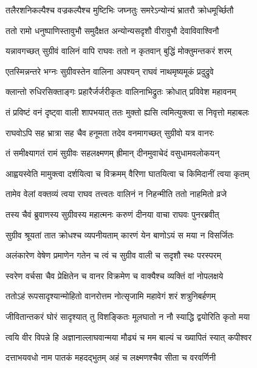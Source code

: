 \twolineshloka
{तलैरशनिकल्पैश्च वज्रकल्पैश्च मुष्टिभिः}
{जघ्नतुः समरेऽन्योन्यं भ्रातरौ क्रोधमूर्च्छितौ} %

\twolineshloka
{ततो रामो धनुष्पाणिस्तावुभौ समुदैक्षत}
{अन्योन्यसदृशौ वीरावुभौ देवाविवाश्विनौ} %

\twolineshloka
{यन्नावगच्छत् सुग्रीवं वालिनं वापि राघवः}
{ततो न कृतवान् बुद्धिं मोक्तुमन्तकरं शरम्} %

\twolineshloka
{एतस्मिन्नन्तरे भग्नः सुग्रीवस्तेन वालिना}
{अपश्यन् राघवं नाथमृष्यमूकं प्रदुद्रुवे} %

\twolineshloka
{क्लान्तो रुधिरसिक्ताङ्गः प्रहारैर्जर्जरीकृतः}
{वालिनाभिद्रुतः क्रोधात् प्रविवेश महावनम्} %

\twolineshloka
{तं प्रविष्टं वनं दृष्ट्वा वाली शापभयात् ततः}
{मुक्तो ह्यसि त्वमित्युक्त्वा स निवृत्तो महाबलः} %

\twolineshloka
{राघवोऽपि सह भ्रात्रा सह चैव हनूमता}
{तदेव वनमागच्छत् सुग्रीवो यत्र वानरः} %

\twolineshloka
{तं समीक्ष्यागतं रामं सुग्रीवः सहलक्ष्मणम्}
{ह्रीमान् दीनमुवाचेदं वसुधामवलोकयन्} %

\twolineshloka
{आह्वयस्वेति मामुक्त्वा दर्शयित्वा च विक्रमम्}
{वैरिणा घातयित्वा च किमिदानीं त्वया कृतम्} %

\twolineshloka
{तामेव वेलां वक्तव्यं त्वया राघव तत्त्वतः}
{वालिनं न निहन्मीति ततो नाहमितो व्रजे} %

\twolineshloka
{तस्य चैवं ब्रुवाणस्य सुग्रीवस्य महात्मनः}
{करुणं दीनया वाचा राघवः पुनरब्रवीत्} %

\twolineshloka
{सुग्रीव श्रूयतां तात क्रोधश्च व्यपनीयताम्}
{कारणं येन बाणोऽयं स मया न विसर्जितः} %

\twolineshloka
{अलंकारेण वेषेण प्रमाणेन गतेन च}
{त्वं च सुग्रीव वाली च सदृशौ स्थः परस्परम्} %

\twolineshloka
{स्वरेण वर्चसा चैव प्रेक्षितेन च वानर}
{विक्रमेण च वाक्यैश्च व्यक्तिं वां नोपलक्षये} %

\twolineshloka
{ततोऽहं रूपसादृश्यान्मोहितो वानरोत्तम}
{नोत्सृजामि महावेगं शरं शत्रुनिबर्हणम्} %

\twolineshloka
{जीवितान्तकरं घोरं सादृश्यात् तु विशङ्कितः}
{मूलघातो न नौ स्याद्धि द्वयोरिति कृतो मया} %

\twolineshloka
{त्वयि वीर विपन्ने हि अज्ञानाल्लाघवान्मया}
{मौढ्यं च मम बाल्यं च ख्यापितं स्यात् कपीश्वर} %

\twolineshloka
{दत्ताभयवधो नाम पातकं महदद्भुतम्}
{अहं च लक्ष्मणश्चैव सीता च वरवर्णिनी} %

